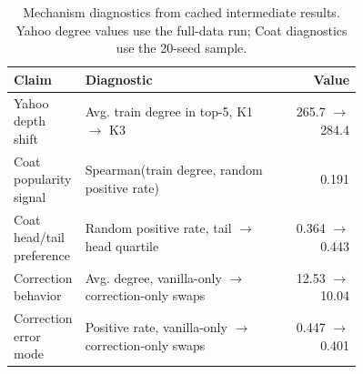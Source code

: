 \begin{table}[t]
\centering
\small
\caption{Mechanism diagnostics from cached intermediate results. Yahoo degree values use the full-data run; Coat diagnostics use the 20-seed sample.}
\label{tab:mechanism}
\begin{tabular}{@{}p{0.20\linewidth}p{0.56\linewidth}r@{}}
\toprule
Claim & Diagnostic & Value \\
\midrule
Yahoo depth shift & Avg. train degree in top-5, K1 $\to$ K3 & 265.7 $\to$ 284.4 \\
Coat popularity signal & Spearman(train degree, random positive rate) & 0.191 \\
Coat head/tail preference & Random positive rate, tail $\to$ head quartile & 0.364 $\to$ 0.443 \\
Correction behavior & Avg. degree, vanilla-only $\to$ correction-only swaps & 12.53 $\to$ 10.04 \\
Correction error mode & Positive rate, vanilla-only $\to$ correction-only swaps & 0.447 $\to$ 0.401 \\
\bottomrule
\end{tabular}
\end{table}
